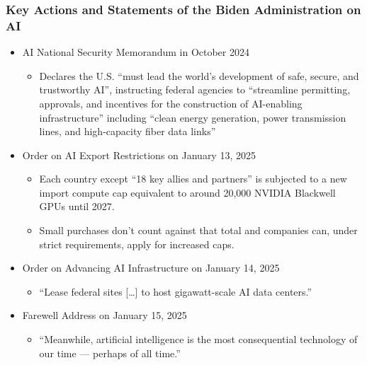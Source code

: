 \documentclass[aspectratio=169]{beamer}
\begin{document}
    \begin{frame}
        \frametitle{Key Actions and Statements of the Biden Administration on AI}
        \begin{itemize}
            \item AI National Security Memorandum in October 2024~\parencite{white_house_memorandum_2024}
            \begin{itemize}
                \item Declares the U.S. ``must lead the world’s development of safe, secure, and trustworthy AI'', instructing federal agencies to ``streamline permitting, approvals, and incentives for the construction of AI-enabling infrastructure'' including ``clean energy generation, power transmission lines, and high-capacity fiber data links''
            \end{itemize}
            \item Order on AI Export Restrictions on January 13, 2025~\parencite{white_house_fact_sheet_2025}
            \begin{itemize}
                \item Each country except ``18 key allies and partners'' is subjected to a new import compute cap equivalent to around 20,000 NVIDIA Blackwell GPUs until 2027.
                \item Small purchases don't count against that total and companies can, under strict requirements, apply for increased caps.
            \end{itemize}
            \item Order on Advancing AI Infrastructure on January 14, 2025~\parencite{white_house_statement_2025}
            \begin{itemize}
                \item ``Lease federal sites [\ldots] to host gigawatt-scale AI data centers.''
            \end{itemize}
            \item Farewell Address on January 15, 2025
            \begin{itemize}
                \item ``Meanwhile, artificial intelligence is the most consequential technology of our time — perhaps of all time.''~\parencite{white_house_farewell_address_2025}
            \end{itemize}
        \end{itemize}
    \end{frame}
\end{document}
